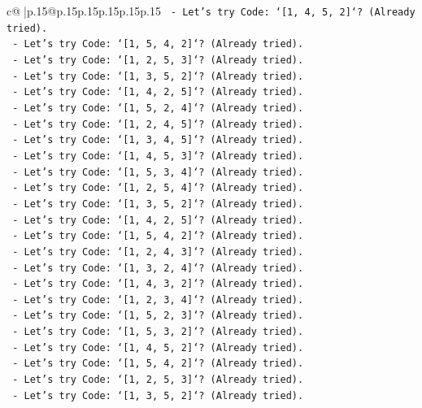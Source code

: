 \documentclass{article}
\begin{document}
{\begin{supertabular}{c@{$\;$}|p{.15\linewidth}@{}p{.15\linewidth}p{.15\linewidth}p{.15\linewidth}p{.15\linewidth}p{.15\linewidth}}
{{{\texttt{    {-} Let's try Code: `{[}1, 4, 5, 2{]}`? (Already tried).} \\
\texttt{    {-} Let's try Code: `{[}1, 5, 4, 2{]}`? (Already tried).} \\
\texttt{    {-} Let's try Code: `{[}1, 2, 5, 3{]}`? (Already tried).} \\
\texttt{    {-} Let's try Code: `{[}1, 3, 5, 2{]}`? (Already tried).} \\
\texttt{    {-} Let's try Code: `{[}1, 4, 2, 5{]}`? (Already tried).} \\
\texttt{    {-} Let's try Code: `{[}1, 5, 2, 4{]}`? (Already tried).} \\
\texttt{    {-} Let's try Code: `{[}1, 2, 4, 5{]}`? (Already tried).} \\
\texttt{    {-} Let's try Code: `{[}1, 3, 4, 5{]}`? (Already tried).} \\
\texttt{    {-} Let's try Code: `{[}1, 4, 5, 3{]}`? (Already tried).} \\
\texttt{    {-} Let's try Code: `{[}1, 5, 3, 4{]}`? (Already tried).} \\
\texttt{    {-} Let's try Code: `{[}1, 2, 5, 4{]}`? (Already tried).} \\
\texttt{    {-} Let's try Code: `{[}1, 3, 5, 2{]}`? (Already tried).} \\
\texttt{    {-} Let's try Code: `{[}1, 4, 2, 5{]}`? (Already tried).} \\
\texttt{    {-} Let's try Code: `{[}1, 5, 4, 2{]}`? (Already tried).} \\
\texttt{    {-} Let's try Code: `{[}1, 2, 4, 3{]}`? (Already tried).} \\
\texttt{    {-} Let's try Code: `{[}1, 3, 2, 4{]}`? (Already tried).} \\
\texttt{    {-} Let's try Code: `{[}1, 4, 3, 2{]}`? (Already tried).} \\
\texttt{    {-} Let's try Code: `{[}1, 2, 3, 4{]}`? (Already tried).} \\
\texttt{    {-} Let's try Code: `{[}1, 5, 2, 3{]}`? (Already tried).} \\
\texttt{    {-} Let's try Code: `{[}1, 5, 3, 2{]}`? (Already tried).} \\
\texttt{    {-} Let's try Code: `{[}1, 4, 5, 2{]}`? (Already tried).} \\
\texttt{    {-} Let's try Code: `{[}1, 5, 4, 2{]}`? (Already tried).} \\
\texttt{    {-} Let's try Code: `{[}1, 2, 5, 3{]}`? (Already tried).} \\
\texttt{    {-} Let's try Code: `{[}1, 3, 5, 2{]}`? (Already tried).} \\
}}}
\end{supertabular}}
\end{document}
